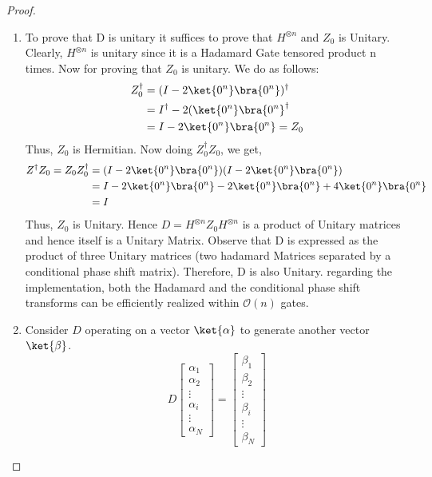 \documentclass[12pt, oneside]{book}
\theoremstyle{definition}
\theoremstyle{definition}
\theoremstyle{remark}
\begin{document}
\begin{proof}
    \begin{enumerate}
        \item To prove that D is unitary it suffices to prove that $H^{\otimes n}$ and $Z_0$ is Unitary. Clearly, $H^{\otimes n}$ is unitary since it is a Hadamard Gate tensored product n times. Now for proving that $Z_0$ is unitary. We do as follows:
        \begin{align*}
        Z^{\dagger}_0&=(I-2\ket{0^n}\bra{0^n})^{\dagger}\\
        &=I^{\dagger}-2(\ket{0^n}\bra{0^n}^{\dagger}\\
        &=I-2\ket{0^n}\bra{0^n}=Z_0\\
        \end{align*}
        Thus, $Z_0$ is Hermitian. Now doing $Z^{\dagger}_0Z_0$, we get,
        \begin{align*}
        Z^{\dagger}Z_0=Z_0Z^{\dagger}_0&=(I-2\ket{0^n}\bra{0^n})(I-2\ket{0^n}\bra{0^n})\\
        &=I-2\ket{0^n}\bra{0^n}-2\ket{0^n}\bra{0^n}+4\ket{0^n}\bra{0^n}\\
        &=I
        \end{align*}
        Thus, $Z_0$ is Unitary. Hence $D=H^{\otimes n}Z_0H^{\otimes n}$ is a product of Unitary matrices and hence itself is a Unitary Matrix. Observe that D is expressed as the product of three Unitary matrices (two hadamard Matrices separated by a conditional phase shift matrix). Therefore, D is also Unitary. regarding the implementation, both the Hadamard and the conditional phase shift transforms can be efficiently realized within $\mathcal{O}(n)$ gates.
        \item Consider $D$ operating on a vector $\ket{\alpha}$ to generate another vector $\ket{\beta}$.
        \[
        D\begin{bmatrix}\alpha_1 \\ \alpha_2 \\ \vdots \\ \alpha_i \\ \vdots \\\alpha_N \end{bmatrix} = \begin{bmatrix} \beta_1\\ \beta_2 \\ \vdots \\\beta_i \\ \vdots \\ \beta_N \end{bmatrix}
\]
\end{enumerate}
\end{proof}
\end{document}
